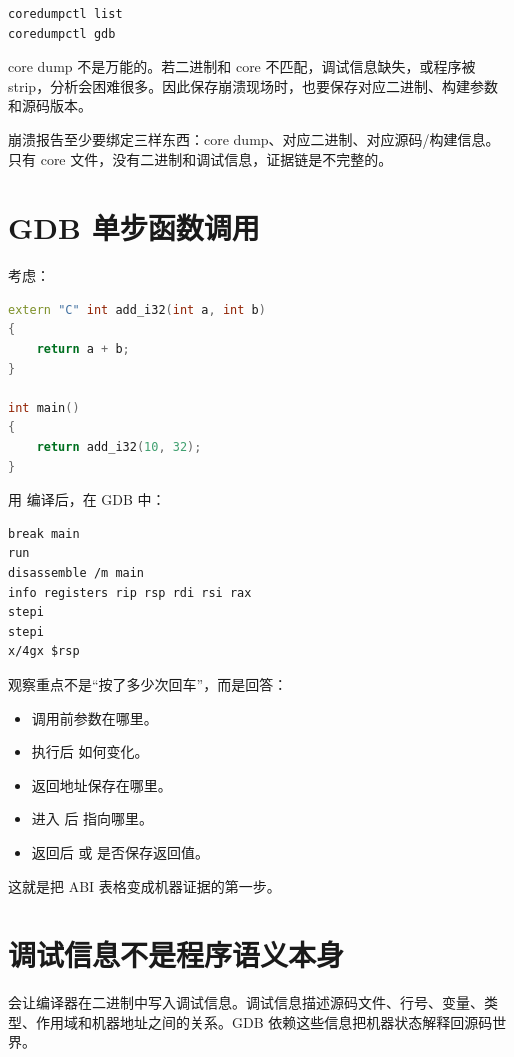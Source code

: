 \begin{lstlisting}[language=bash]
coredumpctl list
coredumpctl gdb
\end{lstlisting}

core dump 不是万能的。若二进制和 core 不匹配，调试信息缺失，或程序被 strip，分析会困难很多。因此保存崩溃现场时，也要保存对应二进制、构建参数和源码版本。

\begin{keyidea}
崩溃报告至少要绑定三样东西：core dump、对应二进制、对应源码/构建信息。只有 core 文件，没有二进制和调试信息，证据链是不完整的。
\end{keyidea}

\section{GDB 单步函数调用}

考虑：

\begin{lstlisting}[language=C++]
extern "C" int add_i32(int a, int b)
{
    return a + b;
}

int main()
{
    return add_i32(10, 32);
}
\end{lstlisting}

用  编译后，在 GDB 中：

\begin{lstlisting}
break main
run
disassemble /m main
info registers rip rsp rdi rsi rax
stepi
stepi
x/4gx $rsp
\end{lstlisting}

观察重点不是“按了多少次回车”，而是回答：

\begin{itemize}
  \item 调用前参数在哪里。
  \item {} 执行后  如何变化。
  \item 返回地址保存在哪里。
  \item 进入  后  指向哪里。
  \item 返回后  或  是否保存返回值。
\end{itemize}

这就是把 ABI 表格变成机器证据的第一步。

\section{调试信息不是程序语义本身}

 会让编译器在二进制中写入调试信息。调试信息描述源码文件、行号、变量、类型、作用域和机器地址之间的关系。GDB 依赖这些信息把机器状态解释回源码世界。

